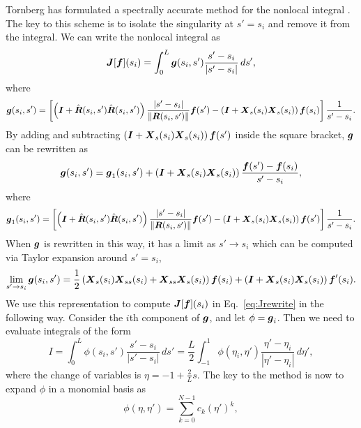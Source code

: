 Tornberg has formulated a spectrally accurate method for the nonlocal integral \cite{tornquad}. The key to this scheme is to isolate the singularity at $s'=s_i$ and remove it from the integral. We can write the nonlocal integral as
\begin{equation}
\label{eq:Jrewrite}
\boldsymbol{J}[\boldsymbol{f}](s_i) = \int_0^L \boldsymbol{g}(s_i,s') \frac{s'-s_i}{|s'-s_i|} \, ds', 
\end{equation}
where 
\begin{equation}
\boldsymbol{g}(s_i,s') = \left[ \left(\boldsymbol{I}+\hat{\boldsymbol{R}}(s_i,s')\hat{\boldsymbol{R}}(s_i,s')\right) \frac{|s'-s_i|}{\left\Vert \boldsymbol{R}(s_i,s')\right\Vert} \boldsymbol{f}(s') - \left(\boldsymbol{I}+\boldsymbol{X}_s(s_i) \boldsymbol{X}_s(s_i)\right) \boldsymbol{f}(s_i)\right] \frac{1}{s'-s_i}. 
\end{equation}
By adding and subtracting $\left(\boldsymbol{I}+\boldsymbol{X}_s(s_i)\boldsymbol{X}_s(s_i)\right)\boldsymbol{f}(s')$ inside the square bracket, $\boldsymbol{g}$ can be rewritten as
\begin{equation}
\boldsymbol{g}(s_i,s')=\boldsymbol{g}_1(s_i,s') + \left(\boldsymbol{I}+\boldsymbol{X}_s(s_i)\boldsymbol{X}_s(s_i)\right)\frac{\boldsymbol{f}(s')-\boldsymbol{f}(s_i)}{s'-s_i}, 
\end{equation}
where
\begin{equation}
\boldsymbol{g}_1(s_i,s') = \left[ \left(\boldsymbol{I}+\hat{\boldsymbol{R}}(s_i,s')\hat{\boldsymbol{R}}(s_i,s')\right) \frac{|s'-s_i|}{\left\Vert \boldsymbol{R}(s_i,s')\right\Vert} \boldsymbol{f}(s') - \left(\boldsymbol{I}+\boldsymbol{X}_s(s_i) \boldsymbol{X}_s(s_i)\right)\boldsymbol{f}(s')\right] \frac{1}{s'-s_i}. 
\end{equation}
When $\boldsymbol{g}$ is rewritten in this way, it has a limit as $s' \rightarrow s_i$ which can be computed via Taylor expansion around $s'=s_i$,  
\begin{equation}
\lim_{s' \to s_i} \boldsymbol{g}(s_i,s') = \frac{1}{2}\left(\boldsymbol{X}_s(s_i)\boldsymbol{X}_{ss}(s_i)+\boldsymbol{X}_{ss}\boldsymbol{X}_s(s_i)\right)\boldsymbol{f}(s_i) + \left(\boldsymbol{I}+\boldsymbol{X}_s(s_i)\boldsymbol{X}_s(s_i)\right)\boldsymbol{f}'(s_i). 
\end{equation}
We use this representation to compute $\boldsymbol{J}[\boldsymbol{f}](s_i)$ in Eq.\ \eqref{eq:Jrewrite} in the following way. Consider the $i$th component of $\boldsymbol{g}$, and let $\phi=\boldsymbol{g}_i$. Then we need to evaluate integrals of the form
\begin{equation}
\label{eq:specint}
I = \int_0^L \phi(s_i,s') \frac{s'-s_i}{|s'-s_i|} \, ds' = \frac{L}{2}\int_{-1}^1 \phi(\eta_i, \eta') \frac{\eta'-\eta_i}{|\eta'-\eta_i|} \, d\eta', 
\end{equation}
where the change of variables is $\eta=-1+\frac{2}{L}s$. The key to the method is now to expand $\phi$ in a monomial basis as 
\begin{equation}
\phi(\eta,\eta') = \sum_{k=0}^{N-1} c_k (\eta')^k, 
\end{equation}
